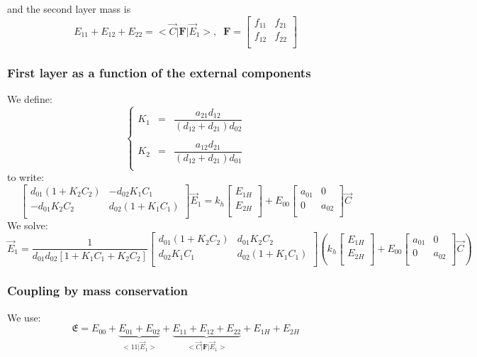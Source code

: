 \documentclass[aps,onecolumn,12pt]{revtex4}
\newcommand{\mymat}[1]{{\bm{#1}}}
\begin{document}
and the second layer mass is
\begin{equation}
E_{11} + E_{12} + E_{22} = <{\vec{C}} \vert \mymat{F} \vert \vec{E}_1 >, \;\;
 \mymat{F} 
 = \begin{bmatrix}
	f_{11} & f_{21}\\
	f_{12} & f_{22}\\
\end{bmatrix}
\end{equation}

\subsubsection{First layer as a function of the external components}
We define:
\begin{equation}
\left\lbrace
\begin{array}{rcl}
K_1 & = & \dfrac{a_{21} d_{12}}{\left(d_{12}+d_{21}\right)d_{02}} \\
\\
K_2 & = & \dfrac{a_{12} d_{21}}{\left(d_{12}+d_{21}\right)d_{01}}\\
\end{array}
\right.
\end{equation}
to write:
\begin{equation}
 \begin{bmatrix}
 d_{01} \left(1+K_2C_2\right) & -d_{02} K_1 C_1 \\
 -d_{01} K_2 C_2 & d_{02} \left(1+K_1C_1\right)\\
 \end{bmatrix}
 \vec{E}_1 = 
 k_h 
 \begin{bmatrix}
 E_{1H}\\
 E_{2H}\\
 \end{bmatrix}
 +E_{00} 
 \begin{bmatrix}
 a_{01} & 0 \\
 0 & a_{02}\\
 \end{bmatrix}
 \vec{C}
\end{equation}
We solve:
\begin{equation}
\boxed{
	\vec{E}_1 = \dfrac{1}{d_{01}d_{02}\left[1+K_1C_1+K_2C_2\right]}
	 \begin{bmatrix}
 d_{01} \left(1+K_2C_2\right) & d_{01} K_2 C_2\\
  d_{02} K_1 C_1 & d_{02} \left(1+K_1C_1\right)\\
 \end{bmatrix}
\left(
k_h 
 \begin{bmatrix}
 E_{1H}\\
 E_{2H}\\
 \end{bmatrix}
 +E_{00} 
 \begin{bmatrix}
 a_{01} & 0 \\
 0 & a_{02}\\
 \end{bmatrix}
 \vec{C}
\right)
}
\end{equation}

\subsubsection{Coupling by mass conservation}
We use:
\begin{equation}
	\mathfrak{E} = E_{00} + \underbrace{E_{01} + E_{02}}_{<1 1|\vec{E}_1>} + \underbrace{E_{11} + E_{12} + E_{22}}_{<\vec{C}|\mymat{F}|\vec{E}_1>} + E_{1H} + E_{2H} 
\end{equation}
\end{document}
